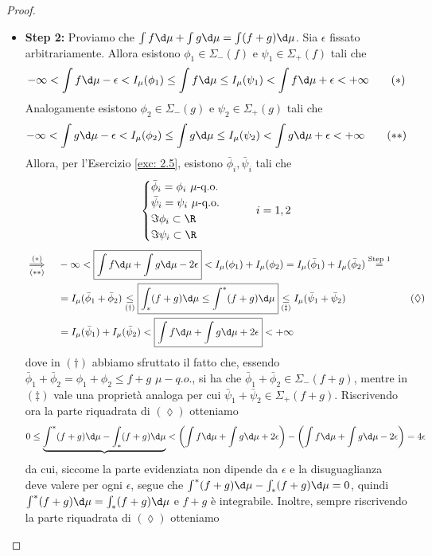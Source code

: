 \begin{proof}
\begin{enumerate}
\begin{itemize}
            \item \textbf{Step 2:} Proviamo che $\int f\d\mu+\int g\d\mu = \int (f+g)\d \mu$. Sia $\epsilon$ fissato arbitrariamente. Allora esistono $\phi_1\in \Sigma_-(f)$ e $\psi_1 \in \Sigma_+(f)$ tali che 
            \[-\infty < \int f\d\mu-\epsilon < I_\mu(\phi_1)\leq \int f\d\mu\leq I_{\mu}(\psi_1)<\int f\d\mu +\epsilon <+\infty \tag{$*$}\]
            Analogamente esistono $\phi_2\in \Sigma_-(g)$ e $\psi_2 \in \Sigma_+(g)$ tali che 
            \[-\infty < \int g\d\mu-\epsilon < I_\mu(\phi_2)\leq \int g\d\mu\leq I_{\mu}(\psi_2)<\int g\d\mu +\epsilon <+\infty \tag{$**$}\]
            Allora, per l'Esercizio \ref{exc: 2.5}, esistono $\bar\phi_i, \bar\psi_i$ tali che 
            \[\begin{cases}
                \bar \phi_i = \phi_i\ \mu\text{-q.o.}\\
                \bar \psi_i = \psi_i\ \mu\text{-q.o.}\\
                \Im \phi_i\subset \R\\  
                \Im \psi_i\subset \R
            \end{cases}\qquad i = 1,2\]
            \[\begin{aligned}\overset{(*)}{\underset{(**)}{\implies}}\quad & -\infty < \boxed{\int f\d\mu  +\int g\d \mu -2\epsilon} < I_\mu(\phi_1)+I_\mu(\phi_2) = I_\mu(\bar \phi_1)+I_\mu(\bar \phi_2) \overset{\text{Step 1}}{=} \\ & = I_\mu (\bar\phi_1+\bar \phi_2)  \underset{(\dagger )}{\leq} \boxed{\int_*(f+g)\d \mu \leq \int^*(f+g)\d\mu} \underset{(\ddagger )}{\leq} I_\mu(\bar\psi_1+\bar\psi_2) \\ &= I_\mu(\bar\psi_1)+I_\mu(\bar\psi_2) < \boxed{\int f\d\mu  +\int g\d \mu + 2\epsilon} < +\infty\end{aligned}\tag{$\lozenge$}\]
            dove in $(\dagger)$ abbiamo sfruttato il fatto che, essendo $\bar \phi_1+\bar \phi_2 = \phi_1+\phi_2\leq f+g$ $\mu-q.o.$, si ha che $ \bar \phi_1+\bar \phi_2 \in \Sigma_-(f+g)$, mentre in $(\ddagger)$ vale una proprietà analoga per cui $\bar\psi_1+\bar\psi_2\in \Sigma_+(f+g)$.
            Riscrivendo ora la parte riquadrata di $(\lozenge)$ otteniamo
            \[0\leq \underbrace{\int^*(f+g)\d\mu-\int_*(f+g)\d\mu}<\left(\int f\d\mu  +\int g\d \mu + 2\epsilon\right)-\left(\int f\d\mu  +\int g\d \mu - 2\epsilon\right)=4\epsilon \]
            da cui, siccome la parte evidenziata non dipende da $\epsilon$ e la disuguaglianza deve valere per ogni $\epsilon$, segue che $\int^*(f+g)\d\mu-\int_*(f+g)\d\mu=0$, quindi $\int^*(f+g)\d\mu=\int_*(f+g)\d\mu$ e $f+g$ è integrabile. Inoltre, sempre riscrivendo la parte riquadrata di $(\lozenge)$ otteniamo

\end{itemize}
\end{enumerate}
\end{proof}
